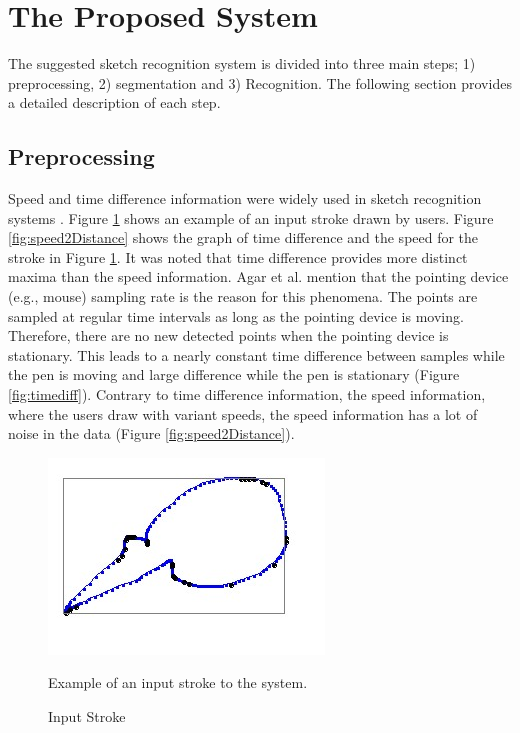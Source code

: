 \documentclass[preprint,10pt,5p,twocolumn]{elsarticle}
\begin{document}
\section{The Proposed System}
\label{Sysdisc}
 The suggested sketch recognition system is divided into three main steps; 1) preprocessing, 2) segmentation and 3) Recognition. The following section provides a detailed description of each step.
 
\subsection{Preprocessing}
\label{Prepross}%
 Speed and time difference information were widely used in sketch recognition systems \cite{earlyprocess}. Figure \ref{fig:orignalStroke} shows an example of an input stroke drawn by users.  Figure \ref{fig:speed2Distance} shows the graph of time difference and the speed for the stroke in Figure \ref{fig:orignalStroke}. It was noted that time difference provides more distinct maxima than the speed information. Agar et al. \cite{polygonfeedback31} mention that the pointing device (e.g., mouse) sampling rate is the reason for this phenomena. The points are sampled at regular time intervals as long as the pointing device is moving. Therefore, there are no new detected points when the pointing device is stationary. This leads to a nearly constant time difference between samples while the pen is moving and large difference while the pen is stationary (Figure \ref{fig:timediff}). Contrary to time difference information, the speed information, where the users draw with variant speeds, the speed information has a lot of noise in the data (Figure \ref{fig:speed2Distance}).  %

 \begin{figure}[h]
	\centering
		\includegraphics[scale=0.5]{images/stroke3.jpg}
	\caption{Input Stroke} Example of an input stroke to the system. 
	\label{fig:orignalStroke}
\end{figure}
\end{document}
